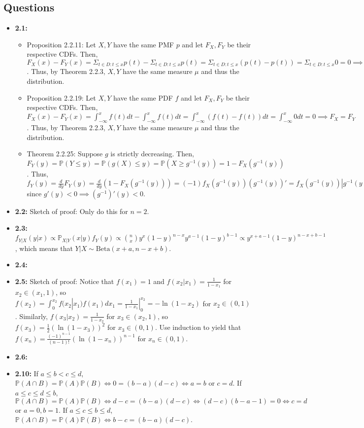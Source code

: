\documentclass[12pt]{article}
\newcommand{\p}{\mathbb{P}}
\begin{document}
\subsection*{Questions}
\begin{itemize}
    \item \textbf{2.1:}
    \begin{itemize}
        \item Proposition 2.2.11: Let $X, Y$ have the same PMF $p$ and let $F_X, F_Y$ be their respective CDFs. Then, $F_X(x) - F_Y(x) = \Sigma_{t \in D: t \leq x} p(t) - \Sigma_{t \in D: t \leq x} p(t) = \Sigma_{t \in D: t \leq x} (p(t) - p(t)) = \Sigma_{t \in D: t \leq x} 0 = 0 \implies F_X = F_Y$. Thus, by Theorem 2.2.3, $X, Y$ have the same measure $\mu$ and thus the distribution.
        \item Proposition 2.2.19: Let $X, Y$ have the same PDF $f$ and let $F_X, F_Y$ be their respective CDFs. Then, $F_X(x) - F_Y(x) = \int_{-\infty}^x f(t)dt - \int_{-\infty}^x f(t)dt = \int_{-\infty}^x (f(t) - f(t))dt = \int_{-\infty}^x 0 dt = 0 \implies F_X = F_Y$. Thus, by Theorem 2.2.3, $X, Y$ have the same measure $\mu$ and thus the distribution.
        \item Theorem 2.2.25: Suppose $g$ is strictly decreasing. Then, $F_Y(y) = \p(Y \leq y) = \p(g(X) \leq y) = \p(X \geq g^{-1}(y)) = 1 - F_X(g^{-1}(y))$. Thus, $f_Y(y) = \frac{d}{dy} F_Y(y) = \frac{d}{dy} (1 - F_X(g^{-1}(y))) = (-1)f_X(g^{-1}(y))(g^{-1}(y))' = f_X(g^{-1}(y))|g^{-1}(y))'|$ since $g'(y) < 0 \implies (g^{-1})'(y) < 0$.
    \end{itemize}
    \item \textbf{2.2:} Sketch of proof: Only do this for $n = 2$.
    \item \textbf{2.3:} $f_{Y|X}(y|x) \propto \p_{X|Y}(x|y) f_Y(y) \propto \binom{n}{x} y^x (1 - y)^{n - x} y^{a - 1} (1 - y)^{b - 1} \propto y^{x + a - 1} (1 - y)^{n - x + b - 1}$, which means that $Y|X \sim \text{Beta}(x + a, n - x + b)$.
    \item \textbf{2.4:}
    \item \textbf{2.5:} Sketch of proof: Notice that $f(x_1) = 1$ and $f(x_2|x_1) = \frac{1}{1 - x_1}$ for $x_2 \in (x_1, 1)$, so $f(x_2) = \int_0^{x_2} f(x_2|x_1)f(x_1)dx_1 = \frac{1}{1 - x_1} |_0^{x_2} = -\ln(1 - x_2)$ for $x_2 \in (0, 1)$. Similarly, $f(x_3|x_2) = \frac{1}{1 - x_2}$ for $x_3 \in (x_2, 1)$, so $f(x_3) = \frac{1}{2} (\ln(1 - x_3))^2$ for $x_3 \in (0, 1)$. Use induction to yield that $f(x_n) = \frac{(-1)^{n - 1}}{(n - 1)!} (\ln(1 - x_n))^{n - 1}$ for $x_n \in (0, 1)$.
    \item \textbf{2.6:}
    \item \textbf{2.10:} If $a \leq b < c \leq d$, $\p(A \cap B) = \p(A)\p(B) \iff 0 = (b - a)(d - c) \iff a = b$ or $c = d$. If $a \leq c \leq d \leq b$, $\p(A \cap B) = \p(A)\p(B) \iff d - c = (b - a)(d - c) \iff (d - c)(b - a - 1) = 0 \iff c = d$ or $a = 0, b = 1$. If $a \leq c \leq b \leq d$, $\p(A \cap B) = \p(A)\p(B) \iff b - c = (b - a)(d - c)$. 
\end{itemize}
\end{document}
